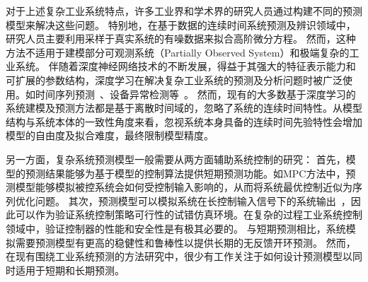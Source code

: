 对于上述复杂工业系统特点，许多工业界和学术界的研究人员通过构建不同的预测模型来解决这些问题。
特别地，在基于数据的连续时间系统预测及辨识领域中，研究人员主要利用采样于真实系统的有噪数据来拟合高阶微分方程。
然而，这种方法不适用于建模部分可观测系统（Partially Observed System）和极端复杂的工业系统。
伴随着深度神经网络技术的不断发展，得益于其强大的特征表示能力和可扩展的参数结构，深度学习在解决复杂工业系统的预测及分析问题时被广泛使用。如时间序列预测~\cite{Member2019,Essien2020,9161367,9522017,neu2021systematic}、设备异常检测等~\cite{9326384}。
然而，现有的大多数基于深度学习的系统建模及预测方法都是基于离散时间域的，忽略了系统的连续时间特性。从模型结构与系统本体的一致性角度来看，忽视系统本身具备的连续时间先验特性会增加模型的自由度及拟合难度，最终限制模型精度。

另一方面，复杂系统预测模型一般需要从两方面辅助系统控制的研究：
首先，模型的预测结果能够为基于模型的控制算法提供短期预测功能。如MPC方法中，预测模型能够模拟被控系统会如何受控制输入影响的，从而将系统最优控制近似为序列优化问题。
其次，预测模型可以模拟系统在长控制输入信号下的系统输出~\cite{Demeester2020SystemIW}，因此可以作为验证系统控制策略可行性的试错仿真环境。在复杂的过程工业系统控制领域中，验证控制器的性能和安全性是有极其必要的。
与短期预测相比，系统模拟需要预测模型有更高的稳健性和鲁棒性以提供长期的无反馈开环预测。
然而，在现有围绕工业系统预测的方法研究中，很少有工作关注于如何设计预测模型以同时适用于短期和长期预测。

